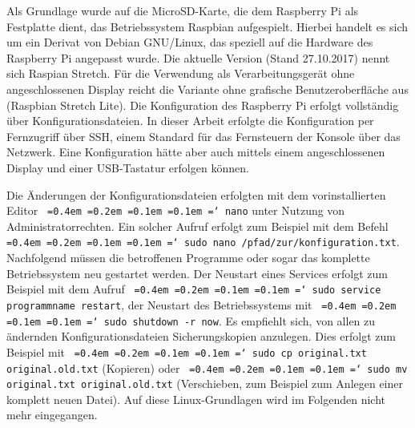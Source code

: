 \documentclass[a4paper,12pt,bibliography=totoc, listof=totoc,titlepage,pointlessnumbers]{scrreprt}
\newcommand*\justify{%
  \fontdimen2\font=0.4em%
  \fontdimen3\font=0.2em%
  \fontdimen4\font=0.1em%
  \fontdimen7\font=0.1em%
  \hyphenchar\font=`\-%
}
\newcommand{\code}[1]{\texttt{\justify{#1}}}
\begin{document}
Als Grundlage wurde auf die MicroSD-Karte, die dem Raspberry Pi als Festplatte dient, das Betriebssystem Raspbian aufgespielt. Hierbei handelt es sich um ein Derivat von Debian GNU/Linux, das speziell auf die Hardware des Raspberry Pi angepasst wurde. Die aktuelle Version (Stand 27.10.2017) nennt sich Raspian Stretch. Für die Verwendung als Verarbeitungsgerät ohne angeschlossenen Display reicht die Variante ohne grafische Benutzeroberfläche aus (Raspbian Stretch Lite). Die Konfiguration des Raspberry Pi erfolgt vollständig über Konfigurationsdateien. In dieser Arbeit erfolgte die Konfiguration per Fernzugriff über SSH, einem Standard für das Fernsteuern der Konsole über das Netzwerk. Eine Konfiguration hätte aber auch mittels einem angeschlossenen Display und einer USB-Tastatur erfolgen können.

Die Änderungen der Konfigurationsdateien erfolgten mit dem vorinstallierten Editor \code{nano} unter Nutzung von Administratorrechten. Ein solcher Aufruf erfolgt zum Beispiel mit dem Befehl \code{sudo nano /pfad/zur/konfiguration.txt}. Nachfolgend müssen die betroffenen Programme oder sogar das komplette Betriebssystem neu gestartet werden. Der Neustart eines Services erfolgt zum Beispiel mit dem Aufruf \code{sudo service programmname restart}, der Neustart des Betriebssystems mit \code{sudo shutdown -r now}. Es empfiehlt sich, von allen zu ändernden Konfigurationsdateien Sicherungskopien anzulegen. Dies erfolgt zum Beispiel mit \code{sudo cp original.txt original.old.txt} (Kopieren) oder \code{sudo mv original.txt original.old.txt} (Verschieben, zum Beispiel zum Anlegen einer komplett neuen Datei). Auf diese Linux-Grundlagen wird im Folgenden nicht mehr eingegangen.

\end{document}
